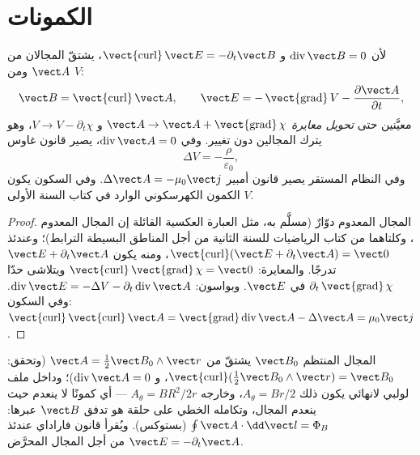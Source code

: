 \section{الكمونات}

\begin{proposition}\label{prop:b2:maxwell-equations:potentials}
لأن $\operatorname{div}\vect B = 0$ و $\operatorname{\vect{curl}}\vect E = -\partial_t
\vect B$، يشتقّ المجالان من \emph{} $\vect A$ ومن
\emph{} $V$:
\[
\vect B = \operatorname{\vect{curl}}\vect A , \qquad
\vect E = -\operatorname{\vect{grad}}V - \frac{\partial\vect A}{\partial t} ,
\]
معيَّنين حتى \emph{تحويل معايرة} $\vect A \to \vect A +
\operatorname{\vect{grad}}\chi$ و $V \to V - \partial_t\chi$، وهو يترك المجالين
دون تغيير. وفي \emph{} $\operatorname{div}\vect A = 0$، يصير قانون
غاوس \emph{}
\[
\Delta V = -\frac\rho{\varepsilon_0} ,
\]
وفي النظام المستقر يصير قانون أمبير $\Delta\vect A = -\mu_0\vect j$.
وفي السكون يكون $V$ الكمون الكهرسكوني الوارد في كتاب السنة الأولى.
\end{proposition}

\begin{proof}
المجال المعدوم  دوّارٌ (مسلَّم به، مثل العبارة
العكسية القائلة إن المجال المعدوم  ، وكلتاهما من كتاب
الرياضيات للسنة الثانية من أجل المناطق البسيطة الترابط)؛ وعندئذ $\operatorname{\vect{curl}}
(\vect E + \partial_t\vect A) = \vect 0$، ومنه يكون $\vect E + \partial_t\vect A$ تدرجًا.
والمعايرة: $\operatorname{\vect{curl}}\operatorname{\vect{grad}}\chi = \vect 0$ ويتلاشى
حدّا $\partial_t\operatorname{\vect{grad}}\chi$ في $\vect E$. وبواسون: $\operatorname{div}
\vect E = -\Delta V - \partial_t\operatorname{div}\vect A$. وفي السكون: $\operatorname{\vect{curl}}
\operatorname{\vect{curl}}\vect A = \operatorname{\vect{grad}}\operatorname{div}\vect A - \Delta\vect A
= \mu_0\vect j$.
\end{proof}

\begin{example}\label{ex:b2:maxwell-equations:vectorpot}
المجال المنتظم $\vect B_0$ يشتقّ من $\vect A = \tfrac12\vect B_0\wedge\vect r$
(وتحقق: $\operatorname{\vect{curl}}(\tfrac12\vect B_0\wedge\vect r) = \vect B_0$، و
$\operatorname{div}\vect A = 0$)؛ وداخل ملف لولبي لانهائي يكون ذلك $A_\theta =
Br/2$، وخارجه $A_\theta = BR^2/2r$ --- أي كمونًا لا ينعدم
حيث ينعدم المجال، وتكامله الخطي على حلقة هو تدفق
$\vect B$ عبرها: $\oint\vect A\cdot\dd\vect l = \Phi_B$ (بستوكس). ويُقرأ قانون فاراداي
عندئذ $\vect E = -\partial_t\vect A$ من أجل المجال المحرَّض.
\end{example}

